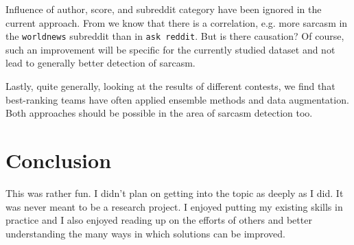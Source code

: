 \documentclass[11pt,a4paper]{article}
\begin{document}
Influence of author, score,  and subreddit category have been ignored in the current approach.  From \cite{khodak-etal-2018-large} we know that there is a correlation, e.g. more sarcasm in the \texttt{worldnews} subreddit than in \texttt{ask reddit}. But is there causation? Of course, such an improvement will be specific for the currently studied dataset and not lead to generally better detection of sarcasm. \par 

Lastly,  quite generally, looking at the results of different contests, we find that best-ranking teams have often applied ensemble methods and data augmentation.  Both approaches should be possible in the area of sarcasm detection too.

\section{Conclusion}

This was rather fun. I didn't plan on getting into the topic as deeply as I did.  It was never meant to be a research project. I enjoyed putting my existing skills in practice and I also enjoyed reading up on the efforts of others and better understanding the many ways in which solutions can be improved.



\end{document}
